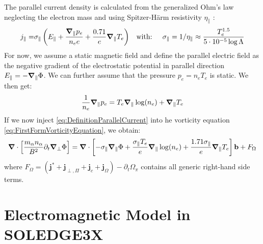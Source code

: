  The parallel current density is calculated from the generalized Ohm's law neglecting the electron mass and using Spitzer-Härm resistivity $\eta_\parallel$ \cite{SpitzerResistivity}:
 \begin{align} 
 	\label{eq:DefinitionParallelCurrent}
 	j_\parallel =& \sigma_\parallel \left(E_\parallel + \frac{\grad_\parallel p_e}{n_ee} + \frac{0.71}{e}\grad_\parallel T_e\right) & \text{with: }&& \sigma_\parallel = 1/\eta_\parallel \approx  \frac{T_e^{1.5}}{5\cdot 10^{-5}\log\Lambda}
 \end{align}
 For now, we assume a static magnetic field and define the parallel electric field as the negative gradient of the electrostatic potential in parallel direction $E_\parallel=-\grad_\parallel\Phi$. We can further assume that the pressure $p_e=n_eT_e$ is static. We then get:  
 $$\frac{1}{n_e}\grad_\parallel p_e = T_e\grad_\parallel\log(n_e) + \grad_\parallel T_e$$
 If we now inject \autoref{eq:DefinitionParallelCurrent} into he vorticity equation \autoref{eq:FirstFormVorticityEquation}, we obtain: 
\begin{equation}
	\label{eq:ElectrostaticVorticityEquation}
	 \grad\cdot\left[\frac{m_\alpha n_\alpha}{ B^2}\partial_t\grad_\perp\Phi\right]  = \grad\cdot\left[-\sigma_\parallel \grad_\parallel\Phi + \frac{\sigma_\parallel T_e}{e}\grad_\parallel\log(n_e) + \frac{1.71\sigma_\parallel}{e}\grad_\parallel T_e\right]\mathbf{b} + F_\Omega
\end{equation}
where $F_\Omega = \left(\mathbf{j}^* + \mathbf{j}_{\perp,\Pi} + \mathbf{j}_{c} + \mathbf{j}_\Omega\right) - \partial_t \Omega_\pi$ contains all generic right-hand side terms. \\



\section{Electromagnetic Model in SOLEDGE3X}
\label{sec:S3X_electromagneticModel}

